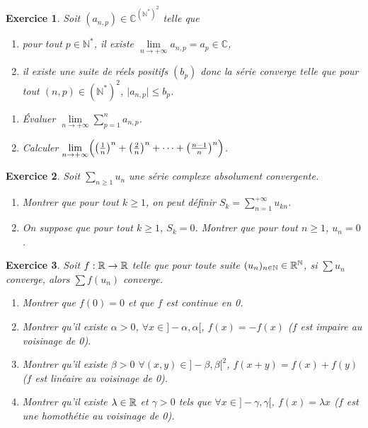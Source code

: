 \documentclass[12pt]{article}
\newtheorem{exercise}{Exercice}[section]
\theoremstyle{remark}
\theoremstyle{remark}
\newcommand{\C}{\mathbb{C}} \newcommand{\Q}{\mathbb{Q}}
\newcommand{\N}{\mathbb{N}} \newcommand{\Z}{\mathbb{Z}}
\begin{document}
\begin{exercise}
	Soit $(a_{n,p})\in\C^{(\N^{*})^{2}}$ telle que 
	\begin{enumerate}
		\item
		[(i)] pour tout $p\in\N^{*}$, il existe
		$\lim\limits_{n\to+\infty}a_{n,p}=a_{p}\in\C$,
		\item
		[(ii)] il existe une suite de réels positifs $(b_{p})$ donc la série
		converge telle que pour tout $(n,p)\in(\N^{*})^{2}$, $\lvert
		a_{n,p}\rvert\leqslant b_{p}$.
		
	\end{enumerate}
	\begin{enumerate}
		\item
		Évaluer $\lim\limits_{n\to+\infty}\sum_{p=1}^{n}a_{n,p}$.
		\item
		Calculer
		$\lim\limits_{n\to+\infty}\Bigl(\bigl(\frac{1}{n}\bigr)^{n}+\bigl(\frac{2}{n}\bigr)^{n}+\dots+\bigl(\frac{n-1}{n}\bigr)^{n}\Bigr)$.
	\end{enumerate}
\end{exercise}

\begin{exercise}
	Soit $\sum_{n\geqslant1}u_{n}$ une série complexe absolument convergente.
	\begin{enumerate}
		\item
		Montrer que pour tout $k\geqslant1$, on peut définir
		$S_{k}=\sum_{n=1}^{+\infty}u_{kn}$.
		\item
		On suppose que pour tout $k\geqslant1$, $S_{k}=0$. Montrer que pour tout
		$n\geqslant1$, $u_{n}=0$.
	\end{enumerate}
\end{exercise}

\begin{exercise}
	Soit $f:\mathbb{R}\to\mathbb{R}$ telle que pour toute suite $(u_{n})_{n\in\N}\in\R^{\N}$, si
$\sum u_{n}$ converge, alors $\sum f(u_{n})$ converge.
\begin{enumerate}
	\item
	Montrer que $f(0)=0$ et que $f$ est continue en 0.
	\item
	Montrer qu'il existe $\alpha>0$, $\forall x\in]-\alpha,\alpha[$, $f(x)=-f(x)$
	($f$ est impaire au voisinage de 0).
	\item
	Montrer qu'il existe $\beta>0$ $\forall(x,y)\in]-\beta,\beta[^{2}$,
	$f(x+y)=f(x)+f(y)$ ($f$ est linéaire au voisinage de 0).
	\item
	Montrer qu'il existe $\lambda\in\mathbb{R}$ et $\gamma>0$ tels que $\forall
	x\in]-\gamma,\gamma[$, $f(x)=\lambda x$ ($f$ est une homothétie au voisinage
	de 0).
\end{enumerate}
\end{exercise}
\end{document}
